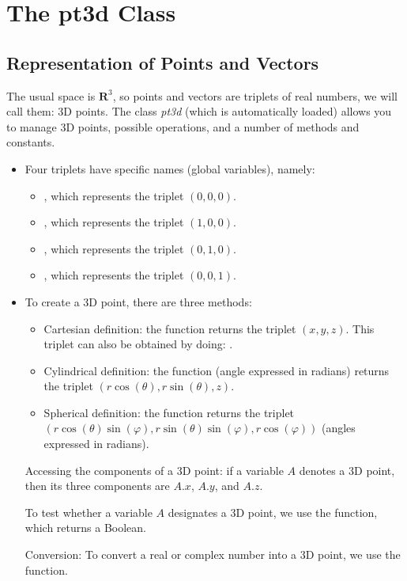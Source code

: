 \section{The pt3d Class}

\subsection{Representation of Points and Vectors}

The usual space is $\mathbf R^3$, so points and vectors are triplets of real numbers, we will call them: 3D points. The class \emph{pt3d} (which is automatically loaded) allows you to manage 3D points, possible operations, and a number of methods and constants.

\begin{itemize}
    \item  Four triplets have specific names (global variables), namely:
    \begin{itemize}
        \item {}, which represents the triplet $(0,0,0)$.
        \item {}, which represents the triplet $(1,0,0)$.
        \item {}, which represents the triplet $(0,1,0)$.
        \item {}, which represents the triplet $(0,0,1)$.
    \end{itemize}
    \item  To create a 3D point, there are three methods:
    \begin{itemize}
        \item Cartesian definition: the function  returns the triplet $(x,y,z)$. This triplet can also be obtained by doing: .
        \item Cylindrical definition: the function  (angle expressed in radians) returns the triplet $(r\cos(\theta),r\sin(\theta),z)$.
        \item Spherical definition: the function  returns the triplet $(r\cos(\theta)\sin(\varphi), r\sin(\theta)\sin(\varphi),r\cos(\varphi))$ (angles expressed in radians).
    \end{itemize}

    Accessing the components of a 3D point: if a variable $A$ denotes a 3D point, then its three components are $A.x$, $A.y$, and $A.z$.

    To test whether a variable $A$ designates a 3D point, we use the  function, which returns a Boolean.

    Conversion: To convert a real or complex number into a 3D point, we use the  function.
\end{itemize}


